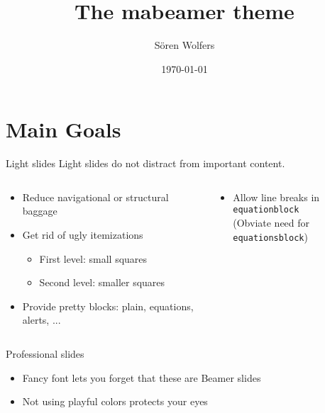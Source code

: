 \documentclass{beamer}
\title{The mabeamer theme}
\date{\today}
\author{Sören Wolfers}
\begin{document}
\maketitle

\section{Main Goals}
\begin{frame}{Light slides}
Light slides do not distract from important content.
\begin{columns}
	\begin{column}{0.5\textwidth}	
		\begin{block}[Done]
		\begin{itemize}
		\item Reduce navigational or structural baggage
		\item Get rid of ugly itemizations	
		\begin{itemize}
		\item First level: small squares
		\item Second level: smaller squares
		\end{itemize}
		\item Provide pretty blocks: plain, equations, alerts, ...
		\end{itemize}
		\end{block}
	\end{column}
	\begin{column}{0.5\textwidth}
		\begin{block}[To Do]
		\begin{itemize}
			\item Allow line breaks in \texttt{equationblock}\\
			 (\imply Obviate need for \texttt{equationsblock})
		\end{itemize}
		\end{block}
	\end{column}
\end{columns}
\end{frame}

\begin{frame}{Professional slides}
\begin{itemize}
	\item Fancy font lets you forget that these are Beamer slides

	\item Not {\color{purple}using} {\color{orange}playful} {\color{green}colors} {\color{red} protects} {\color{yellow}your} {\color{blue}eyes}
	
\end{itemize}
\end{frame}
\end{document}
